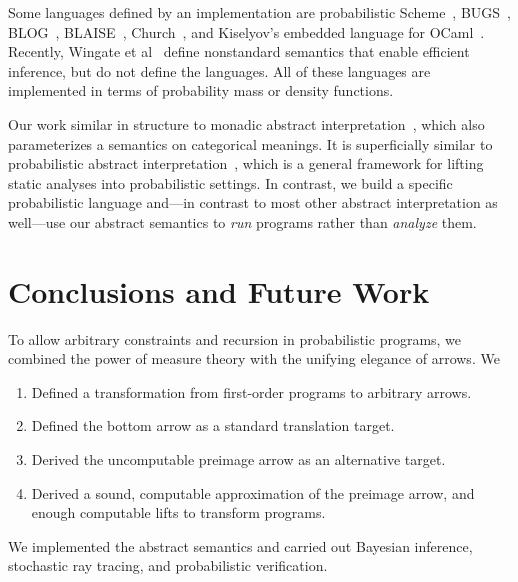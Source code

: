 \documentclass{llncs}
\begin{document}
Some languages defined by an implementation are probabilistic Scheme~\cite{cit:koller-1997aaai-bayes-programs-short}, BUGS~\cite{cit:winbugs-language-short}, BLOG~\cite{cit:blog-language-short}, BLAISE~\cite{cit:blaise-language}, Church~\cite{cit:church-language-short}, and Kiselyov's embedded language for OCaml~\cite{cit:kiselyov-2008uai-monolingual}.
Recently, Wingate et al~\cite{cit:wingate-2011nips-nonstandard} define nonstandard semantics that enable efficient inference, but do not define the languages.
All of these languages are implemented in terms of probability mass or density functions.

Our work similar in structure to monadic abstract interpretation~\cite{cit:sergey-2013pldi-monadic-abstract}, which also parameterizes a semantics on categorical meanings.
It is superficially similar to probabilistic abstract interpretation~\cite{cit:cousot-2012esop-prob}, which is a general framework for lifting static analyses into probabilistic settings.
In contrast, we build a specific probabilistic language and---in contrast to most other abstract interpretation as well---use our abstract semantics to \emph{run} programs rather than \emph{analyze} them.


\section{Conclusions and Future Work}

To allow arbitrary constraints and recursion in probabilistic programs, we combined the power of measure theory with the unifying elegance of arrows. We
\begin{enumerate}
	\item Defined a transformation from first-order programs to arbitrary arrows.
	\item Defined the bottom arrow as a standard translation target.
	\item Derived the uncomputable preimage arrow as an alternative target.
	\item Derived a sound, computable approximation of the preimage arrow, and enough computable lifts to transform programs.
\end{enumerate}
We implemented the abstract semantics and carried out Bayesian inference, stochastic ray tracing, and probabilistic verification.
\end{document}
